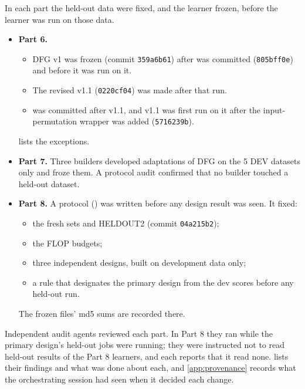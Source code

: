 In each part the held-out data were fixed, and the learner frozen, before the learner was run on those data.
\begin{itemize}
\item \textbf{Part 6.}
  \begin{itemize}
  \item DFG v1 was frozen (commit \texttt{359a6b61}) after  was committed (\texttt{805bff0e}) and before it was run on it.
  \item The revised v1.1 (\texttt{0220cf04}) was made after that run.
  \item {} was committed after v1.1, and v1.1 was first run on it after the input-permutation wrapper was added (\texttt{5716239b}).
  \end{itemize}
   lists the exceptions.
\item \textbf{Part 7.} Three builders developed adaptations of DFG on the 5 DEV datasets only and froze them. A protocol audit confirmed that no builder touched a held-out dataset.
\item \textbf{Part 8.} A protocol () was written before any design result was seen. It fixed:
  \begin{itemize}
  \item the fresh sets  and HELDOUT2 (commit \texttt{04a215b2});
  \item the FLOP budgets;
  \item three independent designs, built on development data only;
  \item a rule that designates the primary design from the dev scores before any held-out run.
  \end{itemize}
  The frozen files' md5 sums are recorded there.
\end{itemize}
Independent audit agents reviewed each part. In Part 8 they ran while the primary design's held-out jobs were running; they were instructed not to read held-out results of the Part 8 learners, and each reports that it read none.  lists their findings and what was done about each, and \cref{app:provenance} records what the orchestrating session had seen when it decided each change.
